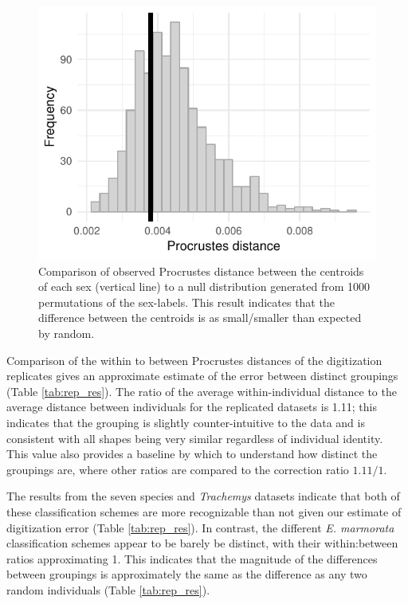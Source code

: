 \documentclass[12pt,letterpaper]{article}
\begin{document}
\begin{figure}[ht]
  \centering
  \includegraphics[height = 0.3\textheight, width = \textwidth, keepaspectratio = true]{figure/sex_test_hist}
  \caption{Comparison of observed Procrustes distance between the centroids of each sex (vertical line) to a null distribution generated from 1000 permutations of the sex-labels. This result indicates that the difference between the centroids is as small/smaller than expected by random.}
  \label{fig:sex_test}
\end{figure}


Comparison of the within to between Procrustes distances of the digitization replicates gives an approximate estimate of the error between distinct groupings (Table \ref{tab:rep_res}). The ratio of the average within-individual distance to the average distance between individuals for the replicated datasets is 1.11; this indicates that the grouping is slightly counter-intuitive to the data and is consistent with all shapes being very similar regardless of individual identity. This value also provides a baseline by which to understand how distinct the groupings are, where other ratios are compared to the correction ratio \(1.11/1\). 

The results from the seven species and \textit{Trachemys} datasets indicate that both of these classification schemes are more recognizable than not given our estimate of digitization error (Table \ref{tab:rep_res}). In contrast, the different \textit{E. marmorata} classification schemes appear to be barely be distinct, with their within:between ratios approximating 1. This indicates that the magnitude of the differences between groupings is approximately the same as the difference as any two random individuals (Table \ref{tab:rep_res}).
\end{document}
